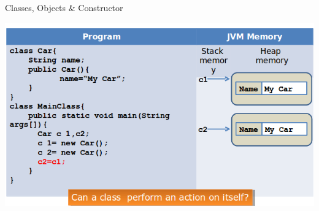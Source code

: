 \documentclass[14pt]{beamer}
\begin{document}
\begin{frame}{Classes, Objects \& Constructor}
\begin{center}
\includegraphics[scale=0.5]{COJ-M01-S03-Image23.png}
\end{center}
\end{frame}
\end{document}
